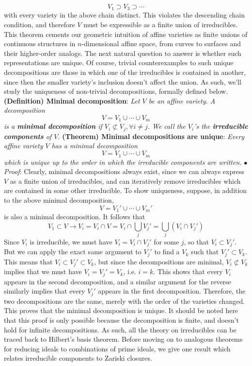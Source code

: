 \documentclass{article}
\newcommand*{\tb}{\textbf}
\newcommand*{\ti}{\textit}
\newcommand*{\n}{\newline}
\newcommand*{\nn}{\newline \newline}
\newcommand*{\Pf}{\indent \ensuremath{\bullet} \textit{Proof}: }
\begin{document}
$$ V_1 \supset V_3 \supset \cdots $$
\indent with every variety in the above chain distinct. This violates the descending chain condition, and therefore $ V $ must be expressible as a finite union of irreducibles. \qedsymbol
\nn
This theorem cements our geometric intuition of affine varieties as finite unions of continuous structures in $ n $-dimensional affine space, from curves to surfaces and their higher-order analogs. The next natural question to answer is whether such representations are unique. Of course, trivial counterexamples to such unique decompositions are those in which one of the irreducibles is contained in another, since then the smaller variety's inclusion doesn't affect the union. As such, we'll study the uniqueness of non-trivial decompositions, formally defined below.
\nn
\tb{(Definition) Minimal decomposition}: \ti{Let $ V $ be an affine variety. A decomposition}
$$ V = V_1 \cup \cdots \cup V_m $$
\indent \ti{is a \tb{minimal decomposition} if $ V_i \not \subset V_j, \forall i \neq j $. We call the $ V_i $'s the \tb{irreducible components} of $ V $.}
\nn
\tb{(Theorem) Minimal decompositions are unique}: \ti{Every affine variety $ V $ has a minimal decomposition}
$$ V = V_1 \cup \cdots \cup V_m $$
\indent \ti{which is unique up to the order in which the irreducible components are written.}
\n
\Pf Clearly, minimal decompositions always exist, since we can always express $ V $ as a finite union of irreducibles, and can iteratively remove irreducibles which are contained in some other irreducible. To show uniqueness, suppose, in addition to the above minimal decomposition,
$$ V = V_1' \cup \cdots \cup V_m' $$
is also a minimal decomposition. It follows that
$$ V_1 \subset V \rightarrow V_i = V_i \cap V = V_i \cap \bigcup_j V_j' = \bigcup_j (V_i \cap V_j') $$
Since $ V_i $ is irreducible, we must have $ V_i = V_i \cap V_j' $ for some $ j $, so that $ V_i \subset V_j' $. But we can apply the exact same argument to $ V_j' $ to find a $ V_k $ such that $ V_j' \subset V_k $. This means that $ V_i \subset V_j' \subset V_k $, but since the decompositions are minimal, $ V_i \not \subset V_k $ implies that we must have $ V_i = V_j' = V_k $, i.e. $ i = k $. This shows that every $ V_i $ appears in the second decomposition, and a similar argument for the reverse similarly implies that every $ V_j' $ appears in the first decomposition. Therefore, the two decompositions are the same, merely with the order of the varieties changed. This proves that the minimal decomposition is unique. \qedsymbol
\nn
It should be noted here that this proof is only possible because the decomposition is finite, and doesn't hold for infinite decompositions. As such, all the theory on irreducibles can be traced back to Hilbert's basis theorem. Before moving on to analogous theorems for reducing ideals to combinations of prime ideals, we give one result which relates irreducible components to Zariski closures.
\end{document}
